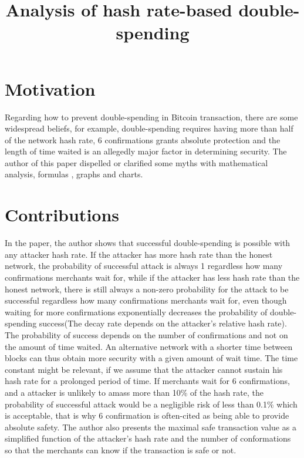 \documentclass[conference]{IEEEtran}
\begin{document}
\title{Analysis of hash rate-based double-spending}


\author{
\and
{}
}
\maketitle
\IEEEpeerreviewmaketitle



\section{Motivation}

Regarding how to prevent double-spending in Bitcoin transaction, there are some widespread beliefs, for example, double-spending requires having more than half of the network hash rate, 6 confirmations grants absolute protection and  the length of time waited is an allegedly major factor in determining security.
The author of this paper dispelled or clarified some myths with mathematical analysis, formulas , graphs and charts.

\section{Contributions}

In the paper, the author shows that successful double-spending is possible with any attacker hash rate.
If the attacker has more hash rate than the honest network, the probability of successful attack is always 1 regardless how many confirmations merchants wait for, while if the attacker has less hash rate than the honest network, there is still always a non-zero probability for the attack to be successful regardless how many confirmations merchants wait for, even though waiting for more confirmations exponentially decreases the probability of double-spending success(The decay rate depends on the attacker's relative hash rate). 
The probability of success depends on the number of confirmations and not on the amount of time waited.
An alternative network with a shorter time between blocks can thus obtain more security with a given amount of wait time.
The time constant might be relevant, if we assume that the attacker cannot sustain his hash rate for a prolonged period of time.
If merchants wait for 6 confirmations, and a attacker is unlikely to amass more than 10\% of the hash rate, the probability of successful attack would be a negligible risk of less than 0.1\% which is acceptable, that is why 6 confirmation is often-cited as being able to provide absolute safety.
The author also presents the maximal safe transaction value as a simplified function of the attacker's hash rate and the number of conformations so that the merchants can know if the transaction is safe or not.
\end{document}
